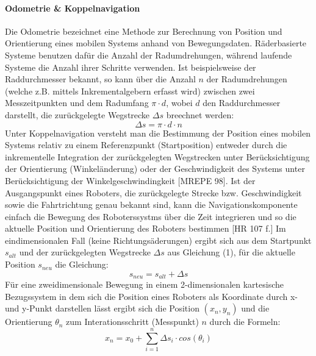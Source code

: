 \paragraph{Odometrie \& Koppelnavigation}
\color{process}
Die Odometrie bezeichnet eine Methode zur Berechnung von Position und Orientierung eines mobilen Systems anhand von Bewegungsdaten. Räderbasierte Systeme benutzen dafür die Anzahl der Radumdrehungen, während laufende Systeme die Anzahl ihrer Schritte verwenden. Ist beispielsweise der Raddurchmesser bekannt, so kann über die Anzahl $n$ der Radumdrehungen (welche z.B. mittels Inkrementalgebern erfasst wird) zwischen zwei Messzeitpunkten und dem Radumfang $\pi \cdot d$, wobei $d$ den Raddurchmesser darstellt, die zurückgelegte Wegstrecke $\Delta{}s$ breechnet werden:
\begin{equation}
\Delta{}s = \pi \cdot d \cdot n
\end{equation}
Unter Koppelnavigation versteht man die Bestimmung der Position eines mobilen Systems relativ zu einem Referenzpunkt (Startposition) entweder durch die inkrementelle Integration der zurückgelegten Wegstrecken unter Berücksichtigung der Orientierung (Winkeländerung) oder der Geschwindigkeit des Systems unter Berücksichtigung der Winkelgeschwindingkeit [MREPE 98]. 
\newline
Ist der Ausgangspunkt eines Roboters, die zurückgelegte Strecke bzw. Geschwindigkeit sowie die Fahrtrichtung genau bekannt sind, kann die Navigationskomponente einfach die Bewegung des Roboterssystms über die Zeit integrieren und so die aktuelle Position und Orientierung des Roboters bestimmen [HR 107 f.]
\newline
Im eindimensionalen Fall (keine Richtungsäderungen) ergibt sich aus dem Startpunkt $s_{alt}$ und  der zurückgelegten Wegstrecke $\Delta{}s$ aus Gleichung (1), für die aktuelle Position $s_{neu}$ die Gleichung:
\begin{equation}
s_{neu} = s_{alt} + \Delta{}s
\end{equation}
Für eine zweidimensionale Bewegung in einem 2-dimensionalen kartesische Bezugssystem in dem sich die Position eines Roboters als Koordinate durch x- und y-Punkt darstellen lässt ergibt sich die
Position $(x_{n},y_{n})$ und die Orientierung $\theta{}_{n}$ zum Interationsschritt (Messpunkt) $n$ durch die Formeln:
\begin{equation}
x_{n} = x_{0} + \sum_{i=1}^{n} \Delta{}s_{i} \cdot cos(\theta{}_{i})
\end{equation}
